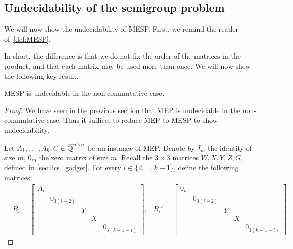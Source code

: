 \subsection{Undecidability of the semigroup problem}

We will now show the undecidability of MESP\@. First, we remind the reader of~\cref{def:MESP}.
\MESP*

In short, the difference is that we do not fix the order of the matrices in the product, and that each matrix may be used more than once. We will now show the following key result.

\begin{theorem}
  MESP is undecidable in the non-commutative case.
\end{theorem}

\begin{proof}
We have seen in the previous section that MEP is undecidable in the non-commutative
case. Thus it suffices to reduce MEP to MESP to show undecidability.

Let $A_1,\ldots,A_k,C\in\overline{\mathbb{Q}}^{n\times n}$ be an instance of MEP\@. Denote by $I_m$ the identity of size $m$,
$0_m$ the zero matrix of size $m$. Recall the $3 \times 3$ matrices $W,X,Y,Z,G$, defined in \cref{sec:lics_gadget}.
For every $i\in\lbrace 2,\ldots,k-1\rbrace$, define the following matrices:
\begin{align*}
&B_{i}=\begin{bmatrix}A_{i}&&&&\\&0_{3(i-2)}&&&\\&&Y&&\\&&&X&\\&&&&0_{3(k-1-i)}\end{bmatrix},
&B_{i}'=\begin{bmatrix}0_n&&&&\\&0_{3(i-2)}&&&\\&&Y&&\\&&&X&\\&&&&0_{3(k-1-i)}\end{bmatrix}.
\end{align*}


\end{proof}
